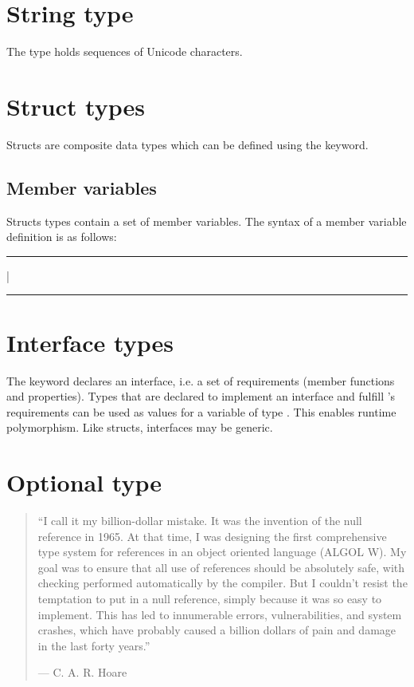 \section{String type}

The type  holds sequences of Unicode characters.

\section{Struct types}

Structs are composite data types which can be defined using the 
keyword.

\subsection{Member variables}

Structs types contain a set of member variables. The syntax of a member variable
definition is as follows:

\begin{grammar}
\rule{let-or-var}  | \\
\rule{member-variable-declaration}   \code{:}  \code{;}
\end{grammar}

\section{Interface types}

The  keyword declares an interface, i.e. a set of requirements
(member functions and properties). Types that are declared to implement an
interface  and fulfill 's requirements can be used as values for
a variable of type . This enables runtime polymorphism. Like structs,
interfaces may be generic.

\section{Optional type}

\begin{quote}
``I call it my billion-dollar mistake. It was the invention of the null
reference in 1965. At that time, I was designing the first comprehensive type
system for references in an object oriented language (ALGOL W). My goal was to
ensure that all use of references should be absolutely safe, with checking
performed automatically by the compiler. But I couldn't resist the temptation to
put in a null reference, simply because it was so easy to implement. This has
led to innumerable errors, vulnerabilities, and system crashes, which have
probably caused a billion dollars of pain and damage in the last forty years.''

--- C. A. R. Hoare
\end{quote}

